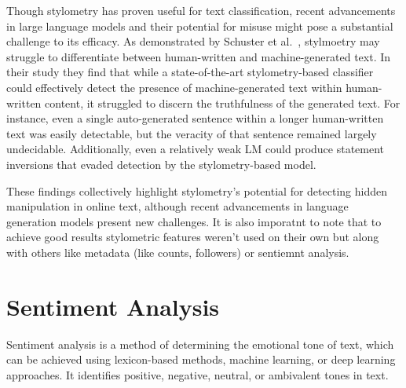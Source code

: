 \documentclass[twoside]{ctuthesis}
\theoremstyle{plain}
\theoremstyle{definition}
\theoremstyle{note}
\begin{document}

Though stylometry has proven useful for text classification, recent advancements in large language models and their potential for misuse might pose a substantial challenge to its efficacy. As demonstrated by Schuster et al.~\cite{Schuster2020}, stylmoetry may struggle to differentiate between human-written and machine-generated text. In their study they find that while a state-of-the-art stylometry-based classifier could effectively detect the presence of machine-generated text within human-written content, it struggled to discern the truthfulness of the generated text.  For instance, even a single auto-generated sentence within a longer human-written text was easily detectable, but the veracity of that sentence remained largely undecidable.  Additionally, even a relatively weak LM could produce statement inversions that evaded detection by the stylometry-based model.\par

These findings collectively highlight stylometry's potential for detecting hidden manipulation in online text, although recent advancements in language generation models present new challenges. It is also imporatnt to note that to achieve good results stylometric features weren't used on their own but along with others like metadata (like counts, followers) or sentiemnt analysis. \par

\section{Sentiment Analysis}
Sentiment analysis is a method of determining the emotional tone of text, which can be achieved using lexicon-based methods, machine learning, or deep learning approaches. It identifies positive, negative, neutral, or ambivalent tones in text.\par
\end{document}
